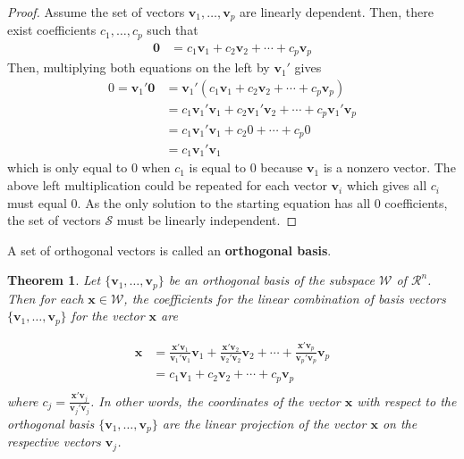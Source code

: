 \documentclass[
]{book}
\newtheorem{theorem}{Theorem}[chapter]
\theoremstyle{definition}
\theoremstyle{definition}
\theoremstyle{definition}
\theoremstyle{definition}
\theoremstyle{remark}
\begin{document}
\begin{proof}
Assume the set of vectors \(\mathbf{v}_1, \ldots, \mathbf{v}_p\) are linearly dependent. Then, there exist coefficients \(c_1, \ldots, c_p\) such that
\[
\begin{aligned}
\mathbf{0} & = c_1 \mathbf{v}_1 + c_2 \mathbf{v}_2 + \cdots + c_p \mathbf{v}_p 
\end{aligned}
\]
Then, multiplying both equations on the left by \(\mathbf{v}_1'\) gives
\[
\begin{aligned}
0 = \mathbf{v}_1' \mathbf{0} & = \mathbf{v}_1' (c_1 \mathbf{v}_1 + c_2 \mathbf{v}_2 + \cdots + c_p \mathbf{v}_p) \\
& = c_1 \mathbf{v}_1' \mathbf{v}_1 + c_2  \mathbf{v}_1' \mathbf{v}_2 + \cdots + c_p  \mathbf{v}_1' \mathbf{v}_p \\
& = c_1 \mathbf{v}_1' \mathbf{v}_1 + c_2  0 + \cdots + c_p 0 \\
& = c_1 \mathbf{v}_1' \mathbf{v}_1
\end{aligned}
\]
which is only equal to 0 when \(c_1\) is equal to 0 because \(\mathbf{v}_1\) is a nonzero vector. The above left multiplication could be repeated for each vector \(\mathbf{v}_i\) which gives all \(c_i\) must equal 0. As the only solution to the starting equation has all 0 coefficients, the set of vectors \(\mathcal{S}\) must be linearly independent.
\end{proof}

A set of orthogonal vectors is called an \textbf{orthogonal basis}.

\begin{theorem}
Let \(\{ \mathbf{v}_1, \ldots, \mathbf{v}_p \}\) be an orthogonal basis of the subspace \(\mathcal{W}\) of \(\mathcal{R}^n\). Then for each \(\mathbf{x} \in \mathcal{W}\), the coefficients for the linear combination of basis vectors \(\{ \mathbf{v}_1, \ldots, \mathbf{v}_p \}\) for the vector \(\mathbf{x}\) are

\[
\begin{aligned}
\mathbf{x} & = \frac{\mathbf{x}'\mathbf{v}_1}{\mathbf{v}_1'\mathbf{v}_1} \mathbf{v}_1 + \frac{\mathbf{x}'\mathbf{v}_2}{\mathbf{v}_2'\mathbf{v}_2} \mathbf{v}_2 + \cdots +  \frac{\mathbf{x}'\mathbf{v}_p}{\mathbf{v}_p'\mathbf{v}_p} \mathbf{v}_p \\
& = c_1 \mathbf{v}_1 + c_2 \mathbf{v}_2 + \cdots + c_p \mathbf{v}_p \\
\end{aligned}
\]
where \(c_j = \frac{\mathbf{x}'\mathbf{v}_j}{\mathbf{v}_j'\mathbf{v}_j}\). In other words, the coordinates of the vector \(\mathbf{x}\) with respect to the orthogonal basis \(\{ \mathbf{v}_1, \ldots, \mathbf{v}_p \}\) are the linear projection of the vector \(\mathbf{x}\) on the respective vectors \(\mathbf{v}_j\).
\end{theorem}
\end{document}
